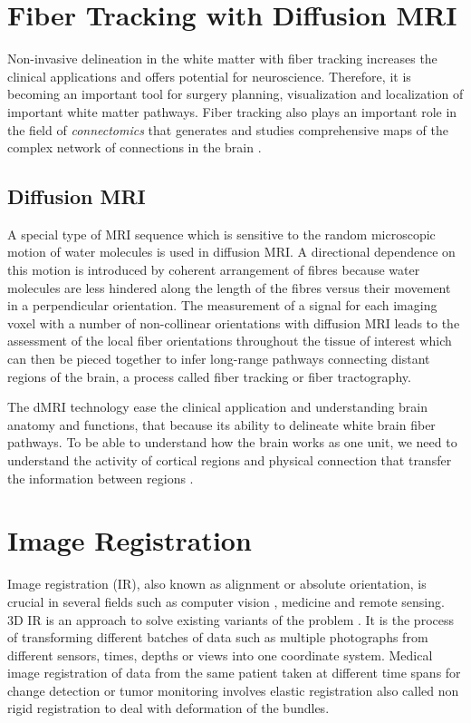 \documentclass[../structure.tex]{subfiles}
\begin{document}
\section{Fiber Tracking with Diffusion MRI}
Non-invasive delineation in the white matter with fiber tracking increases the clinical applications and offers potential for neuroscience. Therefore, it is becoming an important tool for surgery planning, visualization and localization of important white matter pathways. Fiber tracking also plays an important role in the field of \textit{connectomics} that generates and studies comprehensive maps of the complex network of connections in the brain \cite{Jeurissen2017}.

\subsection{Diffusion MRI}
A special type of MRI sequence which is sensitive to the random microscopic motion of water molecules is used in diffusion MRI. A directional dependence on this motion is introduced by coherent arrangement of fibres because water molecules are less hindered along the length of the fibres versus their movement in a perpendicular orientation. The measurement of a signal for each imaging voxel with a number of non-collinear orientations with diffusion MRI leads to the assessment of the local fiber orientations throughout the tissue of interest which can then be pieced together to infer long-range pathways connecting distant regions of the brain, a process called fiber tracking or fiber tractography.

The dMRI technology ease the clinical application and understanding brain anatomy and functions, that because its ability to delineate white brain fiber pathways. To be able to understand how the brain works as one unit, we need to understand the activity of cortical regions and physical connection that transfer the information between regions \cite{Jeurissen2017}.

\section{Image Registration}
Image registration (IR), also known as alignment or absolute orientation, is crucial in several fields such as computer vision , medicine and remote sensing. 3D IR is an approach to solve existing variants of the problem \cite{Cordon2006}. It is the process of transforming different batches of data such as multiple photographs from different sensors, times, depths or views into one coordinate system. Medical image registration of data from the same patient taken at different time spans for change detection or tumor monitoring involves elastic registration also called non rigid registration to deal with deformation of the bundles.
\end{document}
